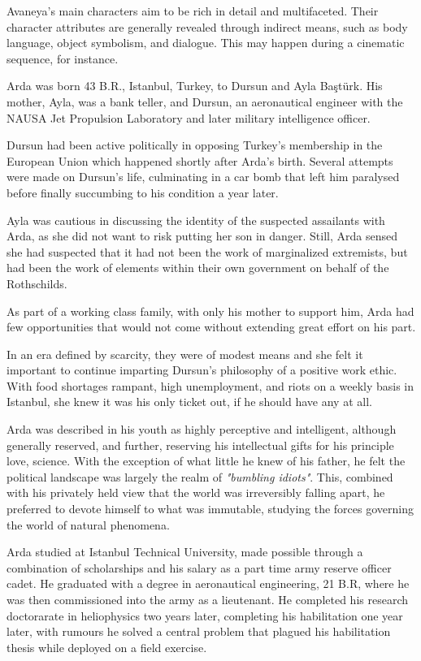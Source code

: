 
Avaneya's main characters aim to be rich in detail and multifaceted. Their character attributes are generally revealed through indirect means, such as body language, object symbolism, and dialogue. This may happen during a cinematic sequence, for instance.

Arda was born 43 B.R., Istanbul, Turkey, to Dursun and Ayla Baştürk. His mother, Ayla, was a bank teller, and Dursun, an aeronautical engineer with the NAUSA Jet Propulsion Laboratory and later military intelligence officer.

Dursun had been active politically in opposing Turkey's membership in the European Union which happened shortly after Arda's birth. Several attempts were made on Dursun's life, culminating in a car bomb that left him paralysed before finally succumbing to his condition a year later.

Ayla was cautious in discussing the identity of the suspected assailants with Arda, as she did not want to risk putting her son in danger. Still, Arda sensed she had suspected that it had not been the work of marginalized extremists, but had been the work of elements within their own government on behalf of the Rothschilds.

As part of a working class family, with only his mother to support him, Arda had few opportunities that would not come without extending great effort on his part. 

In an era defined by scarcity, they were of modest means and she felt it important to continue imparting Dursun's philosophy of a positive work ethic. With food shortages rampant, high unemployment, and riots on a weekly basis in Istanbul, she knew it was his only ticket out, if he should have any at all.

Arda was described in his youth as highly perceptive and intelligent, although generally reserved, and further, reserving his intellectual gifts for his principle love, science. With the exception of what little he knew of his father, he felt the political landscape was largely the realm of {\sl "bumbling idiots"}. This, combined with his privately held view that the world was irreversibly falling apart, he preferred to devote himself to what was immutable, studying the forces governing the world of natural phenomena.

Arda studied at Istanbul Technical University, made possible through a combination of scholarships and his salary as a part time army reserve officer cadet. He graduated with a degree in aeronautical engineering, 21 B.R, where he was then commissioned into the army as a lieutenant. He completed his research doctorarate in heliophysics two years later, completing his habilitation one year later, with rumours he solved a central problem that plagued his habilitation thesis while deployed on a field exercise.

